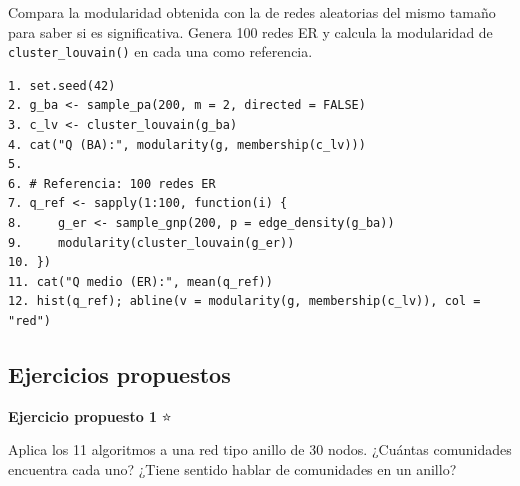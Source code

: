 \documentclass[
  letterpaper,
  DIV=11,
  numbers=noendperiod]{scrreprt}
\begin{document}
\begin{tcolorbox}[enhanced jigsaw, toprule=.15mm, colframe=quarto-callout-note-color-frame, coltitle=black, titlerule=0mm, colback=white, breakable, leftrule=.75mm, arc=.35mm, bottomtitle=1mm, toptitle=1mm, rightrule=.15mm, bottomrule=.15mm, left=2mm, title=\textcolor{quarto-callout-note-color}{\faInfo}\hspace{0.5em}{💡 Pista 2}, colbacktitle=quarto-callout-note-color!10!white, opacityback=0, opacitybacktitle=0.6]

Compara la modularidad obtenida con la de redes aleatorias del mismo
tamaño para saber si es significativa. Genera 100 redes ER y calcula la
modularidad de \texttt{cluster\_louvain()} en cada una como referencia.

\end{tcolorbox}

\begin{tcolorbox}[enhanced jigsaw, toprule=.15mm, colframe=quarto-callout-note-color-frame, coltitle=black, titlerule=0mm, colback=white, breakable, leftrule=.75mm, arc=.35mm, bottomtitle=1mm, toptitle=1mm, rightrule=.15mm, bottomrule=.15mm, left=2mm, title=\textcolor{quarto-callout-note-color}{\faInfo}\hspace{0.5em}{💡 Pista 3 --- Pseudocódigo}, colbacktitle=quarto-callout-note-color!10!white, opacityback=0, opacitybacktitle=0.6]

\begin{verbatim}
1. set.seed(42)
2. g_ba <- sample_pa(200, m = 2, directed = FALSE)
3. c_lv <- cluster_louvain(g_ba)
4. cat("Q (BA):", modularity(g, membership(c_lv)))
5. 
6. # Referencia: 100 redes ER
7. q_ref <- sapply(1:100, function(i) {
8.     g_er <- sample_gnp(200, p = edge_density(g_ba))
9.     modularity(cluster_louvain(g_er))
10. })
11. cat("Q medio (ER):", mean(q_ref))
12. hist(q_ref); abline(v = modularity(g, membership(c_lv)), col = "red")
\end{verbatim}

\end{tcolorbox}

\subsection*{Ejercicios propuestos}\label{ejercicios-propuestos-6}

\textbf{Ejercicio propuesto 1} ⭐

Aplica los 11 algoritmos a una red tipo anillo de 30 nodos. ¿Cuántas
comunidades encuentra cada uno? ¿Tiene sentido hablar de comunidades en
un anillo?
\end{document}
